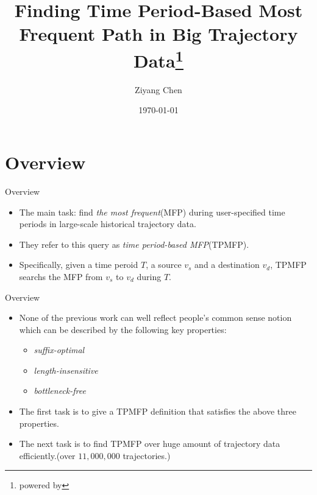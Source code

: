 \documentclass[mathserif]{beamer}
\title[Finding TPMFP in BTD]{Finding Time Period-Based Most Frequent Path in Big Trajectory Data\thanks{powered by \XeLaTeX} }
\author{Ziyang Chen}
\institute[FDU]
{
	Fudan University\\
	\medskip
	\textit{13307130148@fudan.edu.cn}
}
\date{\today}
\begin{document}
\newtheorem{property}[theorem]{\textsc{Property}}

\begin{frame}
\titlepage
\end{frame}


\section{Overview}
\begin{frame}{Overview}
	\begin{itemize}
	\item The main task: find \textit{the most frequent}(MFP) during user-specified time periods in large-scale historical trajectory data.
	\item They refer to this query as \textit{time period-based MFP}(TPMFP).
	\item Specifically, given a time peroid $T$, a source $v_s$ and a destination $v_d$, TPMFP searchs the MFP from $v_s$ to $v_d$ during $T$.
	\end{itemize}
\end{frame}

\begin{frame}{Overview}
	\begin{itemize}
	\item None of the previous work can well reflect people's common sense notion which can be described by the following key properties:\\
		\begin{itemize}
		\item \textit{suffix-optimal}
		\item \textit{length-insensitive}
		\item \textit{bottleneck-free}
		\end{itemize}
	\item The first task is to give a TPMFP definition that satisfies the above three properties.
	\item The next task is to find TPMFP over huge amount of trajectory data efficiently.(over $11,000,000$ trajectories.)
	\end{itemize}
\end{frame}
\end{document}
